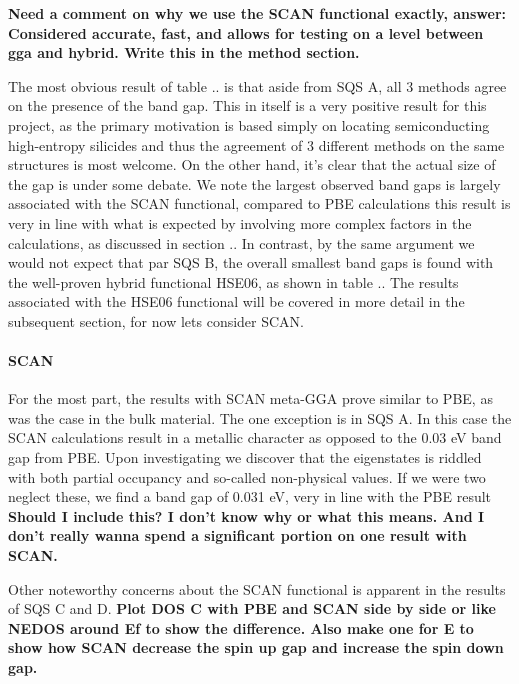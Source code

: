 \textbf{Need a comment on why we use the SCAN functional exactly, answer: Considered accurate, fast, and allows for testing on a level between gga and hybrid. Write this in the method section.}

The most obvious result of table .. is that aside from SQS A, all 3 methods agree on the presence of the band gap. This in itself is a very positive result for this project, as the primary motivation is based simply on locating semiconducting high-entropy silicides and thus the agreement of 3 different methods on the same structures is most welcome. On the other hand, it's clear that the actual size of the gap is under some debate. We note the largest observed band gaps is largely associated with the SCAN functional, compared to PBE calculations this result is very in line with what is expected by involving more complex factors in the calculations, as discussed in section .. In contrast, by the same argument we would not expect that par SQS B, the overall smallest band gaps is found with the well-proven hybrid functional HSE06, as shown in table .. The results associated with the HSE06 functional will be covered in more detail in the subsequent section, for now lets consider SCAN. 
 
\paragraph{SCAN \\}
For the most part, the results with SCAN meta-GGA prove similar to PBE, as was the case in the bulk material. The one exception is in SQS A. In this case the SCAN calculations result in a metallic character as opposed to the 0.03 eV band gap from PBE. Upon investigating we discover that the eigenstates is riddled with both partial occupancy and so-called non-physical values. If we were two neglect these, we find a band gap of 0.031 eV, very in line with the PBE result \textbf{Should I include this? I don't know why or what this means. And I don't really wanna spend a significant portion on one result with SCAN.} 

Other noteworthy concerns about the SCAN functional is apparent in the results of SQS C and D. 
\textbf{Plot DOS C with PBE and SCAN side by side or like NEDOS around Ef to show the difference. Also make one for E to show how SCAN decrease the spin up gap and increase the spin down gap.}


